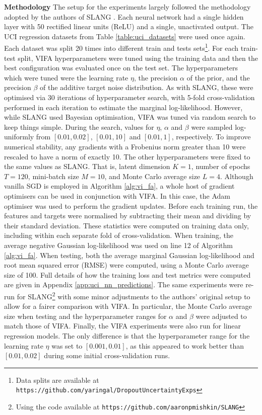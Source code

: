 \documentclass[10pt]{article} %
\begin{document}
\textbf{Methodology} The setup for the experiments largely followed the methodology adopted by the authors of SLANG \citep{mishkin2018}. Each neural network had a single hidden layer with 50 rectified linear units (ReLU) and a single, unactivated output. The UCI regression datasets from Table \ref{table:uci_datasets} were used once again. Each dataset was split 20 times into different train and tests sets\footnote{Data splits are available at \texttt{https://github.com/yaringal/DropoutUncertaintyExps}}. For each train-test split, VIFA hyperparameters were tuned using the training data and then the best configuration was evaluated once on the test set. The hyperparameters which were tuned were the learning rate $\eta$, the precision $\alpha$ of the prior, and the precision $\beta$ of the additive target noise distribution. As with SLANG, these were optimised via 30 iterations of hyperparameter search, with 5-fold cross-validation performed in each iteration to estimate the marginal log-likelihood. However, while SLANG used Bayesian optimisation, VIFA was tuned via random search to keep things simple. During the search, values for $\eta$, $\alpha$ and $\beta$ were sampled log-uniformly from $[0.01, 0.02]$, $[0.01, 10]$ and $[0.01, 1]$, respectively. To improve numerical stability, any gradients with a Frobenius norm greater than 10 were rescaled to have a norm of exactly 10. The other hyperparameters were fixed to the same values as SLANG. That is, latent dimension $K=1$, number of epochs $T=120$, mini-batch size $M=10$, and Monte Carlo average size $L=4$. Although vanilla SGD is employed in Algorithm \ref{alg:vi_fa}, a whole host of gradient optimisers can be used in conjunction with VIFA. In this case, the Adam optimiser \citep{kingma2014} was used to perform the gradient updates. Before each training run, the features and targets were normalised by subtracting their mean and dividing by their standard deviation. These statistics were computed on training data only, including within each separate fold of cross-validation. When training, the average negative Gaussian log-likelihood was used on line 12 of Algorithm \ref{alg:vi_fa}. When testing, both the average marginal Gaussian log-likelihood and root mean squared error (RMSE) were computed, using a Monte Carlo average size of 100. Full details of how the training loss and test metrics were computed are given in Appendix \ref{app:uci_nn_predictions}. The same experiments were re-run for SLANG\footnote{Using the code available at \texttt{https://github.com/aaronpmishkin/SLANG}} with some minor adjustments to the authors' original setup to allow for a fairer comparison with VIFA. In particular, the Monte Carlo average size when testing and the hyperparameter ranges for $\alpha$ and $\beta$ were adjusted to match those of VIFA. Finally, the VIFA experiments were also run for linear regression models. The only difference is that the hyperparameter range for the learning rate $\eta$ was set to $[0.001, 0.01]$, as this appeared to work better than $[0.01, 0.02]$ during some initial cross-validation runs. 
\end{document}
